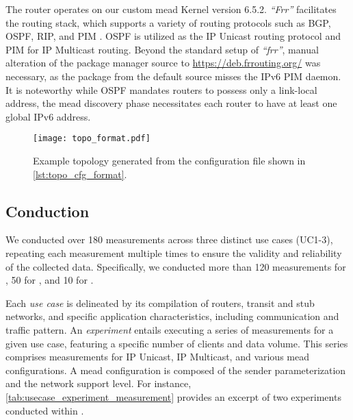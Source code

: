 The router operates on our custom \gls{mead} Kernel version 6.5.2.
\textit{``Frr''} facilitates the routing stack, which supports a variety of
    routing protocols such as BGP, OSPF, RIP, and PIM \cite{frr_doc}.
OSPF is utilized as the IP Unicast routing protocol and PIM for IP Multicast
    routing.
Beyond the standard setup of \textit{``frr''}, manual alteration of the package
    manager source to \url{https://deb.frrouting.org/} was necessary, as the
    package from the default source misses the IPv6 PIM daemon.
It is noteworthy while OSPF mandates routers to possess only a link-local
    address, the \gls{mead} discovery phase necessitates each router to have at
    least one global IPv6 address.

\begin{figure}
    \begin{center}
        \texttt{[image: topo\_format.pdf]}
    \end{center}
    \caption[Example topology]{
        Example topology generated from the configuration file shown in
        \autoref{lst:topo_cfg_format}.
    }
    \label{fig:ex_topo}
\end{figure}


\subsection{Conduction} %
\label{sub:Conduction}

We conducted over 180 measurements across three distinct use cases (UC1-3),
    repeating each measurement multiple times to ensure the validity and
    reliability of the collected data.
Specifically, we conducted more than 120 measurements for \uci{}, 50 for
    \ucii{}, and 10 for \uciii{}.

Each \textit{use case} is delineated by its compilation of routers, transit and
    stub networks, and specific application characteristics, including
    communication and traffic pattern.
An \textit{experiment} entails executing a series of measurements for a given
    use case, featuring a specific number of clients and data volume.
This series comprises measurements for IP Unicast, IP Multicast, and various 
    \gls{mead} configurations.
A \gls{mead} configuration is composed of the sender parameterization and the 
    network support level.
For instance, \autoref{tab:usecase_experiment_measurement} provides an excerpt
    of two experiments conducted within \nuci{}.

